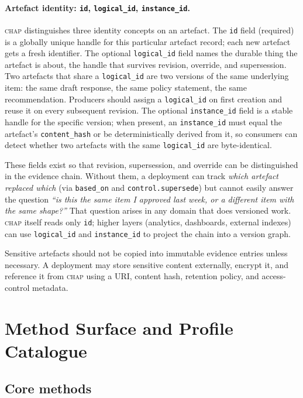 \documentclass[11pt]{article}
\newcommand{\chap}{\textsc{chap}}
\begin{document}
\paragraph{Artefact identity: \texttt{id}, \texttt{logical\_id}, \texttt{instance\_id}.} \chap{} distinguishes three identity concepts on an artefact. The \texttt{id} field (required) is a globally unique handle for this particular artefact record; each new artefact gets a fresh identifier. The optional \texttt{logical\_id} field names the durable thing the artefact is about, the handle that survives revision, override, and supersession. Two artefacts that share a \texttt{logical\_id} are two versions of the same underlying item: the same draft response, the same policy statement, the same recommendation. Producers should assign a \texttt{logical\_id} on first creation and reuse it on every subsequent revision. The optional \texttt{instance\_id} field is a stable handle for the specific version; when present, an \texttt{instance\_id} must equal the artefact's \texttt{content\_hash} or be deterministically derived from it, so consumers can detect whether two artefacts with the same \texttt{logical\_id} are byte-identical.

These fields exist so that revision, supersession, and override can be distinguished in the evidence chain. Without them, a deployment can track \emph{which artefact replaced which} (via \texttt{based\_on} and \texttt{control.supersede}) but cannot easily answer the question \emph{``is this the same item I approved last week, or a different item with the same shape?''} That question arises in any domain that does versioned work. \chap{} itself reads only \texttt{id}; higher layers (analytics, dashboards, external indexes) can use \texttt{logical\_id} and \texttt{instance\_id} to project the chain into a version graph.

Sensitive artefacts should not be copied into immutable evidence entries unless necessary. A deployment may store sensitive content externally, encrypt it, and reference it from \chap{} using a URI, content hash, retention policy, and access-control metadata.

\section{Method Surface and Profile Catalogue}
\label{sec:methods-profiles}

\subsection{Core methods}
\end{document}
